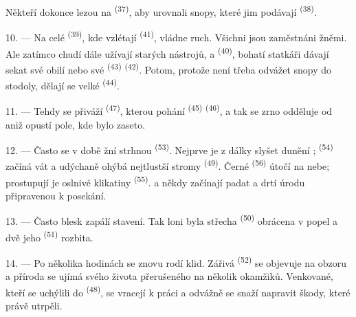 Někteří dokonce lezou na  \textsuperscript{(37)}, aby urovnali snopy, které jim
podávají  \textsuperscript{(38)}.

10. --- Na celé  \textsuperscript{(39)}, kde vzlétají 
\textsuperscript{(41)}, vládne ruch. Všichni jsou zaměstnáni žněmi. Ale zatímco chudí dále
užívají starých nástrojů,  a  \textsuperscript{(40)}, bohatí
statkáři dávají sekat své obilí nebo své  \textsuperscript{(43)}
 \textsuperscript{(42)}. Potom, protože není třeba odvážet snopy do
stodoly, dělají se velké  \textsuperscript{(44)}.

11. --- Tehdy se přiváží  \textsuperscript{(47)}, kterou pohání
 \textsuperscript{(45)} 
\textsuperscript{(46)}, a tak se zrno odděluje od  aniž opustí pole, kde bylo
zaseto.

\VUsaut{5.0mm}
\VUsaut{3.4mm}

12. --- Často se v době žní strhnou  \textsuperscript{(53)}. Nejprve je z dálky
slyšet dunění ;  \textsuperscript{(54)} začíná vát a
udýchaně ohýbá nejtlustší stromy  \textsuperscript{(49)}. Černé 
\textsuperscript{(56)} útočí na nebe; prostupují je oslnivé klikatiny 
\textsuperscript{(55)}.  a někdy  začínají padat a drtí úrodu
připravenou k posekání.

13. --- Často blesk zapálí stavení. Tak loni byla střecha 
\textsuperscript{(50)} obrácena v popel a dvě jeho  \textsuperscript{(51)}
rozbita.

14. --- Po několika hodinách se znovu rodí klid. Zářivá  \textsuperscript{(52)}
se objevuje na obzoru a příroda se ujímá svého života přerušeného na několik okamžiků.
Venkované, kteří se uchýlili do  \textsuperscript{(48)}, se vracejí k práci a
odvážně se snaží napravit škody, které právě utrpěli.

\VUsaut{6.0mm}
\VUsaut{3.6mm}

\VUsaut{1.4mm}
\VUsaut{4.0mm}

